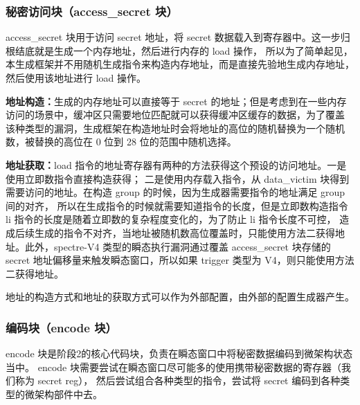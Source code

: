 \subsubsection{秘密访问块（access\_secret 块）}
access\_secret 块用于访问 secret 地址，将 secret 数据载入到寄存器中。这一步归根结底就是生成一个内存地址，然后进行内存的 load 操作，
所以为了简单起见，本生成框架并不用随机生成指令来构造内存地址，而是直接先验地生成内存地址，然后使用该地址进行 load 操作。\par

\textbf{地址构造：}生成的内存地址可以直接等于 secret 的地址；但是考虑到在一些内存访问的场景中，缓冲区只需要地位匹配就可以获得缓冲区缓存的数据，为了覆盖
该种类型的漏洞，生成框架在构造地址时会将地址的高位的随机替换为一个随机数，被替换的高位在 0 位到 28 位的范围中随机选择。\par

\textbf{地址获取：}load 指令的地址寄存器有两种的方法获得这个预设的访问地址。一是使用立即数指令直接构造获得；
二是使用内存载入指令，从 data\_victim 块得到需要访问的地址。在构造 group 的时候，因为生成器需要指令的地址满足 group 间的对齐，
所以在生成指令的时候就需要知道指令的长度，但是立即数构造指令 li 指令的长度是随着立即数的复杂程度变化的，为了防止 li 指令长度不可控，
造成后续生成的指令不对齐，当地址被随机数高位覆盖时，只能使用方法二获得地址。此外，spectre-V4 类型的瞬态执行漏洞通过覆盖
access\_secret 块存储的 secret 地址偏移量来触发瞬态窗口，所以如果 trigger 类型为 V4，则只能使用方法二获得地址。\par

地址的构造方式和地址的获取方式可以作为外部配置，由外部的配置生成器产生。\par

\subsubsection{编码块（encode 块）}
encode 块是阶段2的核心代码块，负责在瞬态窗口中将秘密数据编码到微架构状态当中。
encode 块需要尝试在瞬态窗口尽可能多的使用携带秘密数据的寄存器（我们称为 secret reg），
然后尝试组合各种类型的指令，尝试将 secret 编码到各种类型的微架构部件中去。\par

